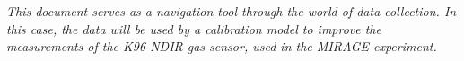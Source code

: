 \textit{This document serves as a navigation tool through the world of data collection. In this case, the data will be used by a calibration model to improve the measurements of the K96 NDIR gas sensor, used in the MIRAGE experiment.}